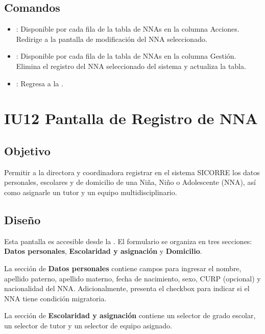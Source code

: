 \subsection{Comandos}
\begin{itemize}
	\item {}: Disponible por cada fila de la tabla de NNAs en la columna Acciones. Redirige a la pantalla de modificación del NNA seleccionado.
	\item {}: Disponible por cada fila de la tabla de NNAs en la columna Gestión. Elimina el registro del NNA seleccionado del sistema y actualiza la tabla.
	\item {}: Regresa a la .
\end{itemize}


\section{IU12 Pantalla de Registro de NNA}

\subsection{Objetivo}
Permitir a la directora y coordinadora registrar en el sistema SICORRE los datos personales, escolares y de domicilio de una Niña, Niño o Adolescente (NNA), así como asignarle un tutor y un equipo multidisciplinario.

\subsection{Diseño}
Esta pantalla  es accesible desde la . El formulario se organiza en tres secciones: \textbf{Datos personales}, \textbf{Escolaridad y asignación} y \textbf{Domicilio}.

La sección de \textbf{Datos personales} contiene campos para ingresar el nombre, apellido paterno, apellido materno, fecha de nacimiento, sexo, CURP (opcional) y nacionalidad del NNA. Adicionalmente, presenta el checkbox  para indicar si el NNA tiene condición migratoria.

La sección de \textbf{Escolaridad y asignación} contiene un selector de grado escolar, un selector de tutor y un selector de equipo asignado.


